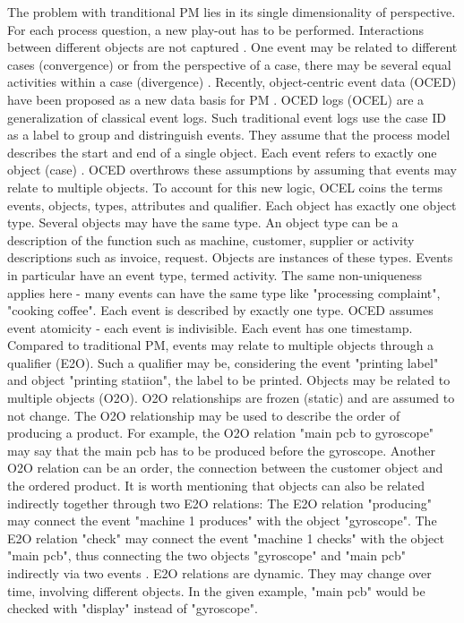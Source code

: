The problem with tranditional PM lies in its single dimensionality of perspective. For each process question, a new play-out has to be performed. Interactions between different objects are not captured \autocite{van2023object}. One event may be related to different cases (convergence) or from the perspective of a case, there may be several equal activities within a case (divergence) \autocite{van2019object}.
Recently, object-centric event data (OCED) have been proposed as a new data basis for PM \autocite{van2019object}. OCED logs (OCEL) are a generalization of classical event logs. Such traditional event logs use the case ID as a label to group and distringuish events. They assume that the process model describes the start and end of a single object. Each event refers to exactly one object (case) \autocite{van2023object}. OCED overthrows these assumptions by assuming that events may relate to multiple objects. To account for this new logic, OCEL coins the terms events, objects, types, attributes and qualifier. Each object has exactly one object type. Several objects may have the same type. An object type can be a description of the function such as machine, customer, supplier or activity descriptions such as invoice, request. Objects are instances of these types. Events in particular have an event type, termed activity. The same non-uniqueness applies here - many events can have the same type like "processing complaint", "cooking coffee". Each event is described by exactly one type. OCED assumes event atomicity - each event is indivisible. Each event has one timestamp. Compared to traditional PM, events may relate to multiple objects through a qualifier (E2O). Such a qualifier may be, considering the event "printing label" and object "printing statiion", the label to be printed. Objects may be related to multiple objects (O2O). O2O relationships are frozen (static) and are assumed to not change. The O2O relationship may be used to describe the order of producing a product. For example, the O2O relation "main pcb to gyroscope" may say that the main pcb has to be produced before the gyroscope. Another O2O relation can be an order, the connection between the customer object and the ordered product. It is worth mentioning that objects can also be related indirectly together through two E2O relations: The E2O relation "producing" may connect the event "machine 1 produces" with the object "gyroscope". The E2O relation "check" may connect the event "machine 1 checks" with the object "main pcb", thus connecting the two objects "gyroscope" and "main pcb" indirectly via two events \autocite{van2019object}. E2O relations are dynamic. They may change over time, involving different objects. In the given example, "main pcb" would be checked with "display" instead of "gyroscope".

